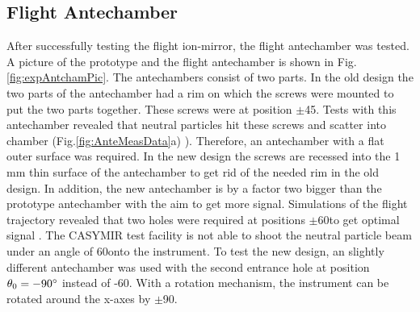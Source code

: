 	\subsection{Flight Antechamber }
	After successfully testing the flight ion-mirror, the flight antechamber was tested. A picture of the prototype and the flight antechamber is shown in Fig.\,\ref{fig:expAntchamPic}. The antechambers consist of two parts. In the old design the two parts of the antechamber had a rim on which the screws were mounted to put the two parts together. These screws were at position $\pm$45\degree. Tests with this antechamber revealed that neutral particles hit these screws and scatter into chamber (Fig.\ref{fig:AnteMeasData}a) \cite{Meyer_2017_ante}). Therefore, an antechamber with a flat outer surface was required. In the new design the screws are recessed into the 1\,\si{\milli\meter} thin surface of the antechamber to get rid of the needed rim in the old design. In addition, the new antechamber is by a factor two bigger than the prototype antechamber with the aim to get more signal. Simulations of the flight trajectory revealed that two holes were required at positions $\pm$60\degree to get optimal signal \cite{SOC_Crema3p2}. The CASYMIR test facility is not able to shoot the neutral particle beam under an angle of 60\degree onto the instrument. To test the new design, an slightly different antechamber was used with the second entrance hole at position $\theta_0 = -90^\circ$ instead of -60\degree. With a rotation mechanism, the instrument can be rotated around the x-axes by $\pm$90\degree.\\
